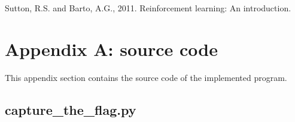 \documentclass[runningheads]{llncs}
\begin{document}
\begin{thebibliography}{8}

Sutton, R.S. and Barto, A.G., 2011. Reinforcement learning: An introduction.

\end{thebibliography}

\section{Appendix A: source code}\label{appendix}
This appendix section contains the source code of the implemented program.

\subsection{capture\_the\_flag.py}\label{capture_the_flag.py}

\end{document}
